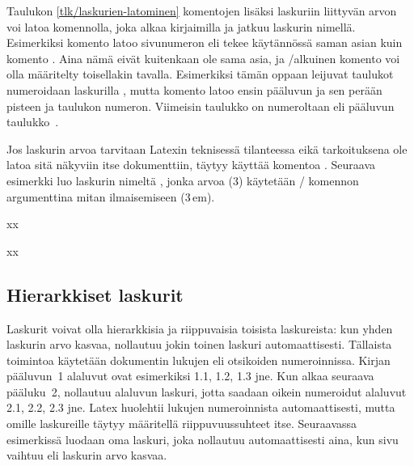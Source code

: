 Taulukon \ref{tlk/laskurien-latominen} komentojen lisäksi laskuriin
liittyvän arvon voi latoa komennolla, joka alkaa kirjaimilla
 ja jatkuu laskurin nimellä. Esimerkiksi komento
 latoo sivunumeron eli tekee käytännössä saman asian
kuin komento . Aina nämä eivät
kuitenkaan ole sama asia, ja \-/alkuinen komento voi olla
määritelty toisellakin tavalla. Esimerkiksi tämän oppaan leijuvat
taulukot numeroidaan laskurilla , mutta komento
 latoo ensin pääluvun ja sen perään pisteen ja
taulukon numeron. Viimeisin taulukko on numeroltaan \thetable{} eli
pääluvun~ taulukko~.

Jos laskurin arvoa tarvitaan Latexin teknisessä tilanteessa eikä
tarkoituksena ole latoa sitä näkyviin itse dokumenttiin, täytyy käyttää
komentoa . Seuraava esimerkki luo laskurin nimeltä
, jonka arvoa (3) käytetään \-/ komennon
argumenttina mitan ilmaisemiseen (3\,em).

\begin{koodilohkosis}
\setcounter{mitta}{3}
xx
\end{koodilohkosis}

\begin{tulossis}
  x\hspace{3em}x
\end{tulossis}

\subsection{Hierarkkiset laskurit}
\label{luku/hierarkkiset-laskurit}

Laskurit voivat olla hierarkkisia ja riippuvaisia toisista laskureista:
kun yhden laskurin arvo kasvaa, nollautuu jokin toinen laskuri
automaattisesti. Tällaista toimintoa käytetään dokumentin lukujen eli
otsikoiden numeroinnissa. Kirjan pääluvun~1 alaluvut ovat esimerkiksi
1.1, 1.2, 1.3 jne. Kun alkaa seuraava pääluku~2, nollautuu alaluvun
laskuri, jotta saadaan oikein numeroidut alaluvut 2.1, 2.2, 2.3 jne.
Latex huolehtii lukujen numeroinnista automaattisesti, mutta omille
laskureille täytyy määritellä riippuvuussuhteet itse. Seuraavassa
esimerkissä luodaan oma laskuri, joka nollautuu automaattisesti aina,
kun sivu vaihtuu eli laskurin  arvo kasvaa.


